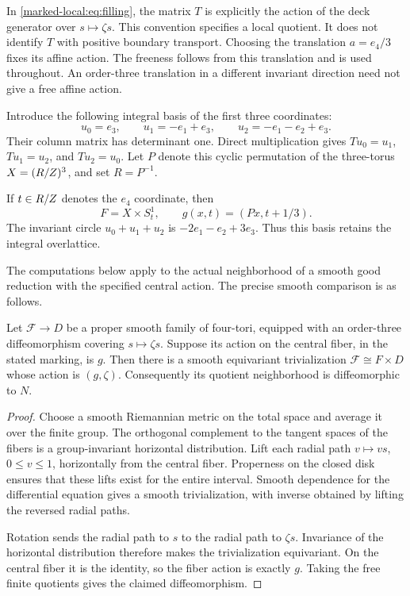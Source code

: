 In \eqref{marked-local:eq:filling}, the matrix $T$ is explicitly the action of
the deck generator over $s\mapsto\zeta s$. This convention specifies
a local quotient. It does not identify $T$ with positive boundary
transport. Choosing the translation $a=e_4/3$ fixes its affine action. The freeness follows from this
translation and is used throughout. An order-three translation in a
different invariant direction need not give a free affine action.

Introduce the following integral basis of the first three coordinates:
\begin{equation}\label{marked-local:eq:permutation-basis}
 u_0=e_3,\qquad u_1=-e_1+e_3,\qquad
 u_2=-e_1-e_2+e_3.
\end{equation}
Their column matrix has determinant one. Direct multiplication gives
$Tu_0=u_1$, $Tu_1=u_2$, and $Tu_2=u_0$.
Let $P$ denote this cyclic permutation of the three-torus
$X=(R/Z)^3$, and set $R=P^{-1}$.

If $t\in R/Z$ denotes the $e_4$ coordinate, then
\begin{equation}\label{marked-local:eq:affine-product}
 F=X\times S^1_t,\qquad g(x,t)=(Px,t+1/3).
\end{equation}
The invariant circle $u_0+u_1+u_2$ is
$-2e_1-e_2+3e_3$. Thus this basis retains the integral overlattice.

The computations below apply to the actual neighborhood of a smooth
good reduction with the specified central action. The precise smooth
comparison is as follows.

\begin{proposition}\label{marked-local:prop:family}
Let $\mathcal F\to D$ be a proper smooth family of four-tori,
equipped with an order-three diffeomorphism covering $s\mapsto\zeta s$.
Suppose its action on the central fiber, in the stated marking, is $g$.
Then there is a smooth equivariant trivialization
$\mathcal F\cong F\times D$ whose action is $(g,\zeta)$.
Consequently its quotient neighborhood is diffeomorphic to $N$.
\end{proposition}

\begin{proof}
Choose a smooth Riemannian metric on the total space and average it
over the finite group. The orthogonal complement to the tangent spaces
of the fibers is a group-invariant horizontal distribution. Lift each
radial path $v\mapsto vs$, $0\le v\le1$, horizontally from the
central fiber. Properness on the closed disk ensures that these lifts
exist for the entire interval. Smooth dependence for the differential
equation gives a smooth trivialization, with inverse obtained by lifting
the reversed radial paths.

Rotation sends the radial path to $s$ to
the radial path to $\zeta s$. Invariance of the horizontal distribution
therefore makes the trivialization equivariant. On the central fiber
it is the identity, so the fiber action is exactly $g$.
Taking the free finite quotients gives the claimed diffeomorphism.
\end{proof}

